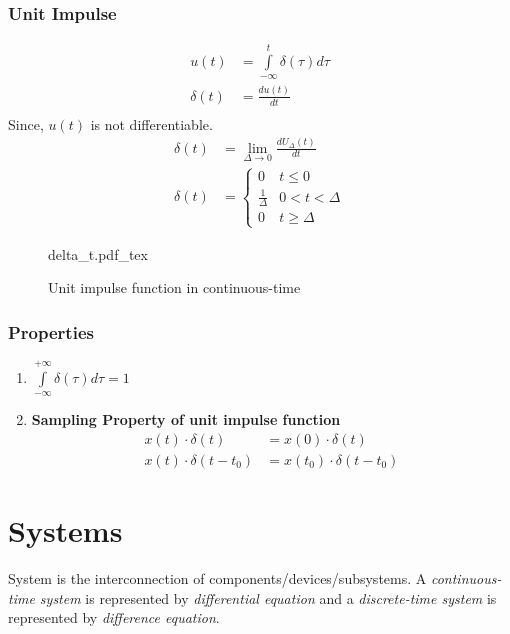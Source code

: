 \documentclass[oneside]{book}
\newcommand{\incfig}[1]{%
    {#1.pdf_tex}
}
\begin{document}
\subsubsection{Unit Impulse}
\begin{align*}
	u(t)      & = \int\limits_{-\infty}^{t}\delta(\tau)d\tau \\
	\delta(t) & = \frac{du(t)}{dt}                           \\
\end{align*}
Since, \(u(t)\) is not differentiable.
\begin{align*}
	\delta(t) & = \lim_{\Delta\rightarrow 0}\frac{dU_\Delta(t)}{dt} \\
	\delta(t) & = \begin{cases}
		0                & t\leq0         \\
		\frac{1}{\Delta} & 0 < t < \Delta \\
		0                & t\geq\Delta
	\end{cases}
\end{align*}
\begin{figure}[ht]
	\centering
	\incfig{delta_t}
	\caption{Unit impulse function in continuous-time}
\end{figure}
\subsubsection{Properties}
\begin{enumerate}
	\item \(\displaystyle\int\limits_{-\infty}^{+\infty}\delta(\tau)d\tau = 1\)
	\item \textbf{Sampling Property of unit impulse function}
	      \begin{align*}
		      x(t)\cdot\delta(t)     & = x(0)\cdot\delta(t)         \\
		      x(t)\cdot\delta(t-t_0) & = x(t_0)\cdot\delta(t - t_0)
	      \end{align*}
\end{enumerate}

\section{Systems}
System is the interconnection of components/devices/subsystems. A \textit{continuous-time system} is represented by \textit{differential equation} and a \textit{discrete-time system} is represented by \textit{difference equation}.
\end{document}
